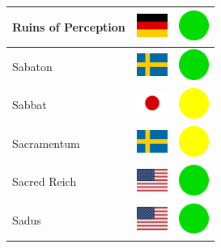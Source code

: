 \documentclass[12pt, a4paper, twoside]{report}
\begin{document}
\begin{center}
\begin{longtable}{|p{5cm}|p{2cm}|p{2cm}|}
 Ruins of Perception                                        & \includegraphics[width=1cm]{../4x3/de} &   \includegraphics[width=1cm]{../likes/y} \\ \hline
 Sabaton                                                    & \includegraphics[width=1cm]{../4x3/se} &   \includegraphics[width=1cm]{../likes/y} \\ \hline
 Sabbat                                                     & \includegraphics[width=1cm]{../4x3/jp} &   \includegraphics[width=1cm]{../likes/m} \\ \hline
 Sacramentum﻿                                                & \includegraphics[width=1cm]{../4x3/se} &   \includegraphics[width=1cm]{../likes/m} \\ \hline
 Sacred Reich                                               & \includegraphics[width=1cm]{../4x3/us} &   \includegraphics[width=1cm]{../likes/y} \\ \hline
 Sadus                                                      & \includegraphics[width=1cm]{../4x3/us} &   \includegraphics[width=1cm]{../likes/y} \\ \hline

\end{longtable}
\end{center}
\end{document}
